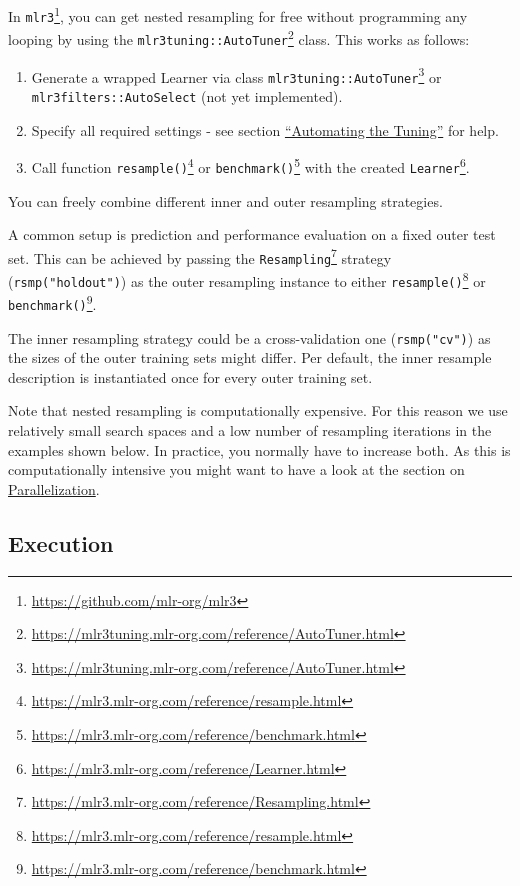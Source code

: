 \documentclass[12pt,]{scrbook}
\providecommand{\tightlist}{%
  \setlength{\itemsep}{0pt}\setlength{\parskip}{0pt}}
\renewcommand{\href}[2]{#2\footnote{\url{#1}}}
\begin{document}
In \href{https://github.com/mlr-org/mlr3}{\texttt{mlr3}}, you can get nested resampling for free without programming any looping by using the \href{https://mlr3tuning.mlr-org.com/reference/AutoTuner.html}{\texttt{mlr3tuning::AutoTuner}} class.
This works as follows:

\begin{enumerate}
\def\labelenumi{\arabic{enumi}.}
\tightlist
\item
  Generate a wrapped Learner via class \href{https://mlr3tuning.mlr-org.com/reference/AutoTuner.html}{\texttt{mlr3tuning::AutoTuner}} or \texttt{mlr3filters::AutoSelect} (not yet implemented).
\item
  Specify all required settings - see section \protect\hyperlink{autotuner}{``Automating the Tuning''} for help.
\item
  Call function \href{https://mlr3.mlr-org.com/reference/resample.html}{\texttt{resample()}} or \href{https://mlr3.mlr-org.com/reference/benchmark.html}{\texttt{benchmark()}} with the created \href{https://mlr3.mlr-org.com/reference/Learner.html}{\texttt{Learner}}.
\end{enumerate}

You can freely combine different inner and outer resampling strategies.

A common setup is prediction and performance evaluation on a fixed outer test set. This can be achieved by passing the \href{https://mlr3.mlr-org.com/reference/Resampling.html}{\texttt{Resampling}} strategy (\texttt{rsmp("holdout")}) as the outer resampling instance to either \href{https://mlr3.mlr-org.com/reference/resample.html}{\texttt{resample()}} or \href{https://mlr3.mlr-org.com/reference/benchmark.html}{\texttt{benchmark()}}.

The inner resampling strategy could be a cross-validation one (\texttt{rsmp("cv")}) as the sizes of the outer training sets might differ.
Per default, the inner resample description is instantiated once for every outer training set.

Note that nested resampling is computationally expensive.
For this reason we use relatively small search spaces and a low number of resampling iterations in the examples shown below.
In practice, you normally have to increase both.
As this is computationally intensive you might want to have a look at the section on \protect\hyperlink{parallelization}{Parallelization}.

\hypertarget{nested-resamp-exec}{%
\subsection{Execution}\label{nested-resamp-exec}}
\end{document}
